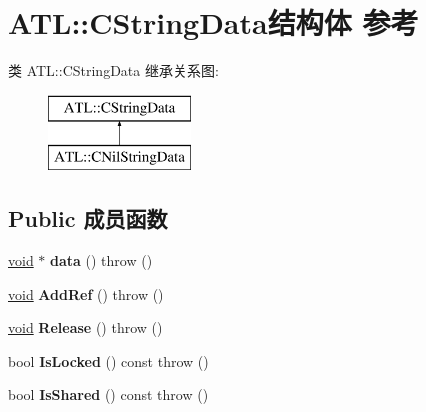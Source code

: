 \hypertarget{struct_a_t_l_1_1_c_string_data}{}\section{A\+TL\+:\+:C\+String\+Data结构体 参考}
\label{struct_a_t_l_1_1_c_string_data}
类 A\+TL\+:\+:C\+String\+Data 继承关系图\+:\begin{figure}[H]
\begin{center}
\leavevmode
\includegraphics[height=2.000000cm]{struct_a_t_l_1_1_c_string_data}
\end{center}
\end{figure}
\subsection*{Public 成员函数}
\begin{DoxyCompactItemize}
\item 
\mbox{\label{struct_a_t_l_1_1_c_string_data_a96cf1830a6e03b1885987aa2cfb20566}} 
\hyperlink{interfacevoid}{void} $\ast$ {\bfseries data} ()  throw ()
\item 
\mbox{\label{struct_a_t_l_1_1_c_string_data_a56e88dfc98876ae5d6c1fd2cd86f18be}} 
\hyperlink{interfacevoid}{void} {\bfseries Add\+Ref} ()  throw ()
\item 
\mbox{\label{struct_a_t_l_1_1_c_string_data_a365ea51ef07cd7014cd5b20c28e57523}} 
\hyperlink{interfacevoid}{void} {\bfseries Release} ()  throw ()
\item 
\mbox{\label{struct_a_t_l_1_1_c_string_data_a4daf2375ac1a149e4cfc4e81d4cf3f23}} 
bool {\bfseries Is\+Locked} () const  throw ()
\item 
\mbox{\label{struct_a_t_l_1_1_c_string_data_afc945a19d61dafd74007dd60f7b2ead4}} 
bool {\bfseries Is\+Shared} () const  throw ()
\end{DoxyCompactItemize}
